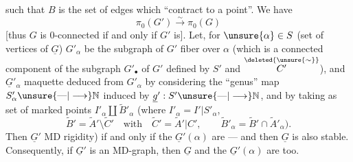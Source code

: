 such that $B$ is the set of edges  which ``contract to a point''. We have
\[
\pi_0(G')\overset{\sim}{\longrightarrow}\pi_0(G)
\]
[thus $G$ is $0$-connected if and only if $G'$ is].  Let, for  $\unsure{\alpha}\in S$ (set of vertices of $\underline{G}$) $G'_\alpha$ be the subgraph of $G'$ fiber over $\alpha$ (which is a connected component of the subgraph $G'_\bullet$ of $G'$ defined by $S'$ and $\overset{\deleted{\unsure{\sim}}}{C'}$), and $\underline{G}'_\alpha$  maquette deduced from $G'_\alpha$ by considering the ``genus'' map $S'_\alpha\unsure{\mathbin{\text{---}}|\longrightarrow}\mathbb N$ induced by $\underline{g}':S'\unsure{\mathbin{\text{---}}|\longrightarrow}\mathbb N$, and by taking as set of marked points $I'_\alpha\amalg\widetilde{B}'_\alpha$ (where $I'_\alpha=I'|S'_\alpha$,
\[
\widetilde{B}'=\widetilde{A}'\setminus\widetilde{C}'\quad\text{with}\quad
\widetilde{C}'=\widetilde{A}'|C',\qquad
\widetilde{B}'_\alpha=\widetilde{B}'\cap\widetilde{A}'_\alpha).
\]
Then $\underline{G}'$   MD rigidity) if and only if the $\underline{G}'(\alpha)$ are --- and then $\underline{G}$ is also stable. Consequently, if $\underline{G}'$ is an MD-graph, then $\underline{G}$ and the $\underline{G}'(\alpha)$ are too.
